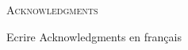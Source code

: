 \newpage
\begin{center}
  {\Huge \textsc{Acknowledgments}}
\end{center}
%
\noindent
%
Ecrire Acknowledgments en français

\newpage
\null
\thispagestyle{empty}
\newpage

